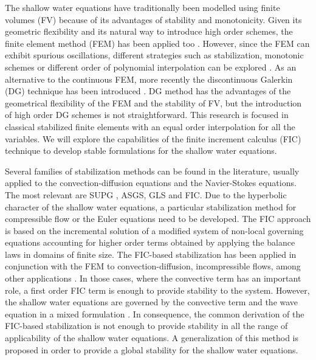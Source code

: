 \documentclass[a4paper,12pt]{elsarticle}
\begin{document}
The shallow water equations have traditionally been modelled using finite volumes (FV) because of its advantages of stability and monotonicity. Given its geometric flexibility and its natural way to introduce high order schemes, the finite element method (FEM) has been applied too \cite{zien3,navon1979,navon1988}.
However, since the FEM can exhibit spurious oscillations, different strategies such as stabilization, monotonic schemes or different order of polynomial interpolation can be explored \cite{hood1974,zien3,ortiz2012}.
As an alternative to the continuous FEM, more recently the discontinuous Galerkin (DG) technique has been introduced \cite{ambati2007,khan2014,lee2019}.
DG method has the advantages of the geometrical flexibility of the FEM and the stability of FV, but the introduction of high order DG schemes is not straightforward.
This research is focused in classical stabilized finite elements with an equal order interpolation for all the variables. We will explore the capabilities of the finite increment calculus (FIC) technique to develop stable formulations for the shallow water equations.

Several families of stabilization methods can be found in the literature, usually applied to the convection-diffusion equations and the Navier-Stokes equations. The most relevant are SUPG \cite{brooks1982},
ASGS\cite{codina1998}, GLS \cite{hughes1989} and FIC\cite{onate1996,onate1998}.
Due to the hyperbolic character of the shallow water equations, a particular stabilization method for compressible flow or the Euler equations need to be developed.
The FIC approach is based on the incremental solution of a modified system of non-local governing equations accounting for higher order terms obtained by applying the balance laws in domains of finite size.
The FIC-based stabilization has been applied in conjunction with the FEM to convection-diffusion, incompressible flows, among other applications \cite{onate1998,onate2001}.
In those cases, where the convective term has an important role, a first order FIC term is enough to provide stability to the system.
However, the shallow water equations are governed by the convective term and the wave equation in a mixed formulation \cite{codina2008}. In consequence, the common derivation of the FIC-based stabilization is not enough to provide stability in all the range of applicability of the shallow water equations. 
A generalization of this method is proposed in order to provide a global stability for the shallow water equations.
\end{document}
